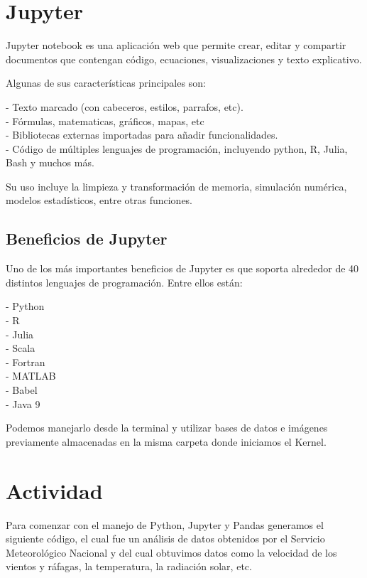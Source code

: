 \documentclass[12pt]{article}
\begin{document}
\section{Jupyter}

Jupyter notebook es una aplicación web que permite crear, editar y compartir documentos que contengan código, ecuaciones, visualizaciones y texto explicativo.

Algunas de sus características principales son:

- Texto marcado (con cabeceros, estilos, parrafos, etc).\\- Fórmulas, matematicas, gráficos, mapas, etc\\- Bibliotecas externas importadas para añadir funcionalidades.\\- Código de múltiples lenguajes de programación, incluyendo python, R, Julia, Bash y muchos más.

Su uso incluye la limpieza y transformación de memoria, simulación numérica, modelos estadísticos, entre otras funciones.

\subsection{Beneficios de Jupyter}

Uno de los más importantes beneficios de Jupyter es que soporta alrededor de 40 distintos lenguajes de programación. Entre ellos están:

- Python\\- R\\- Julia\\- Scala\\- Fortran\\- MATLAB\\- Babel\\- Java 9

Podemos manejarlo desde la terminal y utilizar bases de datos e imágenes  previamente almacenadas en la misma carpeta donde iniciamos el Kernel.

\section{Actividad}

Para comenzar con el manejo de Python, Jupyter y Pandas generamos el siguiente código, el cual fue un análisis de datos obtenidos por el Servicio Meteorológico Nacional y del cual obtuvimos datos como la velocidad de los vientos y ráfagas, la temperatura, la radiación solar, etc.
\end{document}

